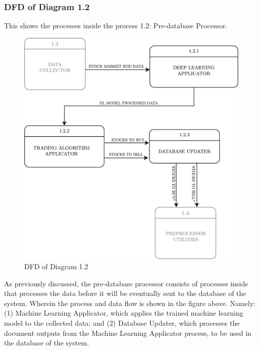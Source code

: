 \subsubsection{DFD of Diagram 1.2}
\label{subsubsec: dfd1.2}
This shows the processes inside the process 1.2: 
Pre-database Processor.
\begin{figure}[ht]
    \centering
    \includegraphics[width=1\textwidth]{./assets/Chapter_3/DFD/DFD_1.2.png}
    \caption{DFD of Diagram 1.2}
    \label{fig:dfd1.2}
\end{figure}
\FloatBarrier

As previously discussed, the pre-database processor consists of processes 
inside that processes the data before it will be eventually sent to the database 
of the system. Wherein the process and data flow is shown in the figure above. 
Namely: (1) Machine Learning Applicator, which applies the trained machine learning 
model to the collected data; and 
(2) Database Updater, which processes the document outputs from the Machine 
Learning Applicator process, to be used in the database of the system.


